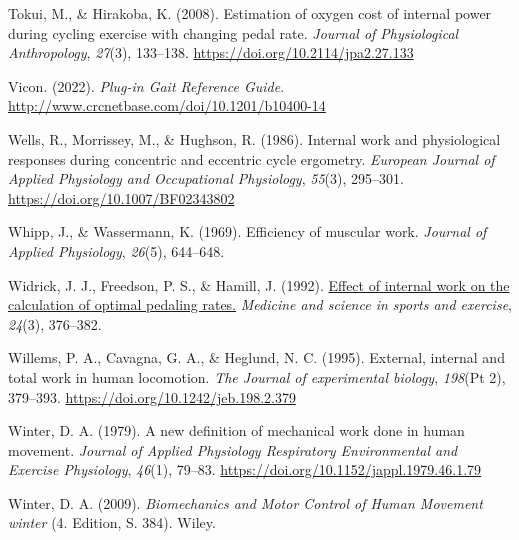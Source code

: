 \documentclass[
  letterpaper,
  DIV=11]{scrartcl}
\newlength{\cslhangindent}
\newenvironment{CSLReferences}[2] %
 {\begin{list}{}{%
  \setlength{\itemindent}{0pt}
  \setlength{\leftmargin}{0pt}
  \setlength{\parsep}{0pt}
  \ifodd #1
   \setlength{\leftmargin}{\cslhangindent}
   \setlength{\itemindent}{-1\cslhangindent}
  \fi
  \setlength{\itemsep}{#2\baselineskip}}}
 {\end{list}}
\begin{document}
\begin{CSLReferences}{1}{0}
Tokui, M., \& Hirakoba, K. (2008). {Estimation of oxygen cost of
internal power during cycling exercise with changing pedal rate}.
\emph{Journal of Physiological Anthropology}, \emph{27}(3), 133--138.
\url{https://doi.org/10.2114/jpa2.27.133}

Vicon. (2022). \emph{{Plug-in Gait Reference Guide}}.
\url{http://www.crcnetbase.com/doi/10.1201/b10400-14}

Wells, R., Morrissey, M., \& Hughson, R. (1986). {Internal work and
physiological responses during concentric and eccentric cycle
ergometry}. \emph{European Journal of Applied Physiology and
Occupational Physiology}, \emph{55}(3), 295--301.
\url{https://doi.org/10.1007/BF02343802}

Whipp, J., \& Wassermann, K. (1969). {Efficiency of muscular work}.
\emph{Journal of Applied Physiology}, \emph{26}(5), 644--648.

Widrick, J. J., Freedson, P. S., \& Hamill, J. (1992).
\href{https://www.ncbi.nlm.nih.gov/pubmed/1549033}{{Effect of internal
work on the calculation of optimal pedaling rates.}} \emph{Medicine and
science in sports and exercise}, \emph{24}(3), 376--382.

Willems, P. A., Cavagna, G. A., \& Heglund, N. C. (1995). {External,
internal and total work in human locomotion.} \emph{The Journal of
experimental biology}, \emph{198}(Pt 2), 379--393.
\url{https://doi.org/10.1242/jeb.198.2.379}

Winter, D. A. (1979). {A new definition of mechanical work done in human
movement}. \emph{Journal of Applied Physiology Respiratory Environmental
and Exercise Physiology}, \emph{46}(1), 79--83.
\url{https://doi.org/10.1152/jappl.1979.46.1.79}

Winter, D. A. (2009). \emph{{Biomechanics and Motor Control of Human
Movement winter}} (4. Edition, S. 384). Wiley.

\end{CSLReferences}
\end{document}
